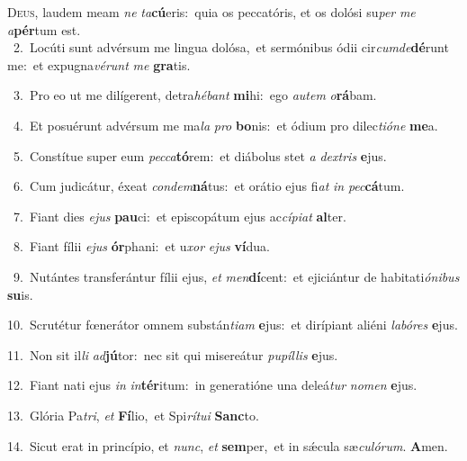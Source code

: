 \lettrine{\initial\textcolor{\initialcolor}{D}}{eus,} laudem meam \textit{ne} \textit{ta}\-\textbf{cú}eris:~\star quia os peccatóris, et os dolósi su\textit{per} \textit{me} \textit{a}\-\textbf{pér}tum est.\\
{\numbfont\textcolor{\numbcolor}{~2.}}~Locúti sunt advérsum me lingua dolósa,~\dagger et sermónibus ódii cir\-\textit{cum}\-\textit{de}\textbf{dé}runt me:~\star et expugna\-\textit{vé}\-\textit{runt} \textit{me} \textbf{gra}\-tis.\par
{\numbfont\textcolor{\numbcolor}{~3.}}~Pro eo ut me dilígerent, detra\-\textit{hé}\-\textit{bant} \textbf{mi}\-hi:~\star ego \textit{au}\-\textit{tem} \textit{o}\-\textbf{rá}bam.\par
{\numbfont\textcolor{\numbcolor}{~4.}}~Et posuérunt advérsum me ma\textit{la} \textit{pro} \textbf{bo}\-nis:~\star et ódium pro dilec\-\textit{ti}\-\textit{ó}\textit{ne} \textbf{me}\-a.\par
{\numbfont\textcolor{\numbcolor}{~5.}}~Constítue super eum \textit{pec}\-\textit{ca}\textbf{tó}rem:~\star et diábolus stet \textit{a} \textit{dex}\-\textit{tris} \textbf{e}\-jus.\par
{\numbfont\textcolor{\numbcolor}{~6.}}~Cum judicátur, éxeat \textit{con}\-\textit{dem}\textbf{ná}tus:~\star et orátio ejus fi\textit{at} \textit{in} \textit{pec}\-\textbf{cá}tum.\par
{\numbfont\textcolor{\numbcolor}{~7.}}~Fiant dies \textit{e}\-\textit{jus} \textbf{pau}\-ci:~\star et episcopátum ejus ac\-\textit{cí}\-\textit{pi}\textit{at} \textbf{al}\-ter.\par
{\numbfont\textcolor{\numbcolor}{~8.}}~Fiant fílii \textit{e}\-\textit{jus} \textbf{ór}\-phani:~\star et u\textit{xor} \textit{e}\-\textit{jus} \textbf{ví}\-dua.\par
{\numbfont\textcolor{\numbcolor}{~9.}}~Nutántes transferántur fílii ejus, \textit{et} \textit{men}\-\textbf{dí}cent:~\star et ejiciántur de habitati\-\textit{ó}\-\textit{ni}\textit{bus} \textbf{su}\-is.\par
{\numbfont\textcolor{\numbcolor}{10.}}~Scrutétur fœnerátor omnem substán\-\textit{ti}\-\textit{am} \textbf{e}\-jus:~\star et dirípiant aliéni \textit{la}\-\textit{bó}\textit{res} \textbf{e}\-jus.\par
{\numbfont\textcolor{\numbcolor}{11.}}~Non sit il\textit{li} \textit{ad}\-\textbf{jú}tor:~\star nec sit qui misereátur \textit{pu}\-\textit{píl}\textit{lis} \textbf{e}\-jus.\par
{\numbfont\textcolor{\numbcolor}{12.}}~Fiant nati ejus \textit{in} \textit{in}\-\textbf{tér}itum:~\star in generatióne una deleá\textit{tur} \textit{no}\-\textit{men} \textbf{e}\-jus.\par
{\numbfont\textcolor{\numbcolor}{13.}}~Glória Pa\-\textit{tri}\-, \textit{et} \textbf{Fí}\-lio,~\star et Spi\-\textit{rí}\-\textit{tu}\textit{i} \textbf{Sanc}\-to.\par
{\numbfont\textcolor{\numbcolor}{14.}}~Sicut erat in princípio, et \textit{nunc}\-, \textit{et} \textbf{sem}\-per,~\star et in sǽcula sæ\-\textit{cu}\-\textit{ló}\textit{rum}. \textbf{A}\-men.\par
